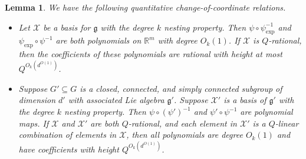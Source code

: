 \documentclass[11pt, a4paper]{amsart}
\theoremstyle{plain}
\theoremstyle{plain}
\newtheorem{lemma}{Lemma}
\theoremstyle{definition}
\theoremstyle{remark}
\numberwithin{equation}{section}
\numberwithin{lemma}{section}
\numberwithin{proposition}{section}
\numberwithin{corollary}{section}
\numberwithin{definition}{section}
\numberwithin{claim}{section}
\begin{document}
\begin{lemma}\label{l:transition}
We have the following quantitative change-of-coordinate relations.
\begin{itemize}
\item Let $\mathcal{X}$ be a basis for $\mathfrak{g}$ with the degree $k$ nesting property. Then $\psi \circ \psi_{\exp}^{-1}$ and $\psi_{\exp} \circ \psi^{-1}$ are both polynomials on $\mathbb{R}^m$ with degree $O_k(1)$. If $\mathcal{X}$ is $Q$-rational, then the coefficients of these polynomials are rational with height at most $Q^{O_k(d^{O(1)})}$.
\item Suppose $G' \subseteq G$ is a closed, connected, and simply connected subgroup of dimension $d'$ with associated Lie algebra $\mathfrak{g}'$. Suppose $\mathcal{X}'$ is a basis of $\mathfrak{g}'$ with the degree $k$ nesting property. Then $\psi \circ (\psi')^{-1}$ and $\psi' \circ \psi^{-1}$ are polynomial maps. If $\mathcal{X}$ and $\mathcal{X}'$ are both $Q$-rational, and each element in $\mathcal{X}'$ is a $Q$-linear combination of elements in $\mathcal{X}$, then all polynomials are degree $O_k(1)$ and have coefficients with height $Q^{O_k(d^{O(1)})}$.
\end{itemize}
\end{lemma}
\end{document}
